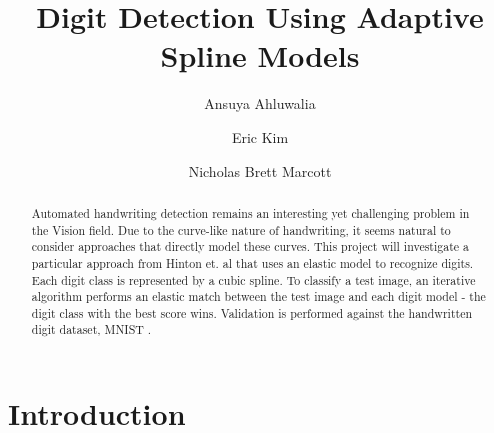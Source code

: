 \documentclass[oribibl]{llncs}
\begin{document}
\title{Digit Detection Using Adaptive Spline Models}
\author{ Ansuya Ahluwalia \and Eric Kim \and Nicholas Brett Marcott }
\maketitle

\begin{abstract}

Automated handwriting detection remains an interesting yet challenging problem in the Vision field. Due to the curve-like nature of handwriting, it seems natural to consider approaches that directly model these curves. This project will investigate a particular approach from Hinton et. al \cite{Hinton92adaptiveelastic} that uses an elastic model to recognize digits. Each digit class is represented by a cubic spline. To classify a test image, an iterative algorithm performs an elastic match between the test image and each digit model - the digit class with the best score wins. Validation is performed against the handwritten digit dataset, MNIST \cite{mnist}.

\end{abstract}


\section{Introduction}
\end{document}
